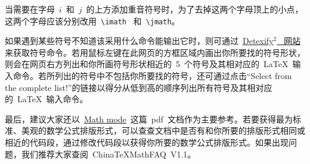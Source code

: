 \xiaosi 当需要在字母~$i$~和~$j$~的上方添加重音符号时，为了去掉这两个字母顶上的小点，这两个字母应该分别改用~\verb|\imath|~ 和~\verb|\jmath|。

如果遇到某些符号不知道该采用什么命令能输出它时，则可通过~\href{http://detexify.kirelabs.org/classify.html}{Detexify$^2$~ 网站}来获取符号命令。若用鼠标左键在此网页的方框区域内画出你所要找的符号形状，则会在网页右方列出和你所画符号形状相近的~5~个符号及其相对应的~\LaTeX~输入命令。若所列出的符号中不包括你所要找的符号，还可通过点击“Select from the complete list!”的链接以得分从低到高的顺序列出所有符号及其相对应的~\LaTeX~输入命令。

最后，建议大家还以~\href{http://tug.ctan.org/cgi-bin/ctanPackageInformation.py?id=voss-mathmode}{Math mode}~这篇~pdf~文档作为主要参考。若要获得最为标准、美观的数学公式排版形式，可以查查文档中是否有和你所要的排版形式相同或相近的代码段，通过修改代码段以获得你所要的数学公式排版形式。如果出现问题，我们推荐大家查阅~ChinaTeXMathFAQ~V1.1。
